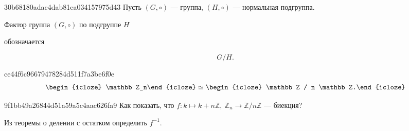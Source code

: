 \begin{note}{30b68180adac4dab81ea034157975d43}
    Пусть \({ (G, \circ) }\) --- группа, \({ (H, \circ) }\) --- нормальная подгруппа.
    \begin{icloze}{2}Фактор группа \({ (G, \circ) }\) по подгруппе \({ H }\)\end{icloze} обозначается
    \begin{icloze}{1}
        \[
            G / H.
        \]
    \end{icloze}
\end{note}

\begin{note}{ce44f6c96679478284d511f7a3be6f0e}
    \[
        \begin{icloze}{2}\mathbb Z_n\end{icloze} \simeq \begin{icloze}{1}\mathbb Z / n \mathbb Z.\end{icloze}
    \]
\end{note}

\begin{note}{9f1bb49a26844d51a59a5c4aac626fa9}
    Как показать, что \({ f : k \mapsto k + n \mathbb Z, \: \mathbb Z_n \to \mathbb Z / n \mathbb Z }\) --- биекция?

    \begin{cloze}{1}
        Из теоремы о делении с остатком определить \({ f^{-1} }\).
    \end{cloze}
\end{note}



